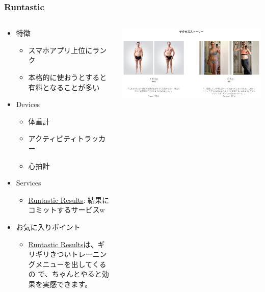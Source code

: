\documentclass[aspectratio=169,11pt,hyperref={colorlinks=true}]{beamer}
\begin{document}
\begin{frame}
  \frametitle{Runtastic}
  \begin{columns}[T]
    \begin{column}{.50\textwidth}
      \begin{itemize}
      \item[] 特徴
        \begin{itemize}
        \item スマホアプリ上位にランク
        \item 本格的に使おうとすると有料となることが多い
        \end{itemize}
      \item[] Devices
        \begin{itemize}
        \item 体重計
        \item アクティビティトラッカー
        \item 心拍計
        \end{itemize}
      \item[] Services
        \begin{itemize}
        \item \href{https://www.runtastic.com/ja/results}{Runtastic Results}: 結果にコミットするサービスw
        \end{itemize}
      \item[] お気に入りポイント
        \begin{itemize}
        \item \href{https://www.runtastic.com/ja/results}{Runtastic
          Results}は、ギリギリきついトレーニングメニューを出してくるの
          で、ちゃんとやると効果を実感できます。
        \end{itemize}
      \end{itemize}
    \end{column}
    \begin{column}{.50\textwidth}
      \begin{center}
        \includegraphics[width=1.1\textwidth]{runtastic_results.png}
      \end{center}
    \end{column}
  \end{columns}
\end{frame}
\end{document}
